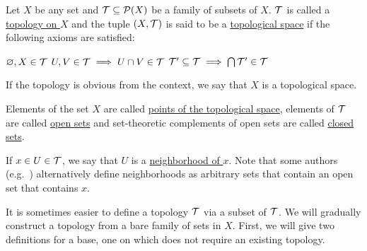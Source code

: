 \begin{definition}\label{def:topological_space}\cite[21]{Lectures:general_topology}
  Let $X$ be any set and $\mathcal T \subseteq \operatorname{\mathcal P}(X)$ be a family of subsets of $X$. $\mathcal T$ is called a \uline{topology on $X$} and the tuple $(X, \mathcal T)$ is said to be a \uline{topological space} if the following axioms are satisfied:
  \begin{description}
     $\varnothing, X \in \mathcal T$
     $U, V \in \mathcal T \implies U \cap V \in \mathcal T$
     $\mathcal T' \subseteq \mathcal T \implies \bigcap \mathcal T' \in \mathcal T$
  \end{description}

  If the topology is obvious from the context, we say that $X$ is a topological space.

  Elements of the set $X$ are called \uline{points of the topological space}, elements of $\mathcal T$ are called \uline{open sets} and set-theoretic complements of open sets are called \uline{closed sets}.

  If $x \in U \in \mathcal T$, we say that $U$ is a \uline{neighborhood of $x$}. Note that some authors (e.g.~\cite[38]{Kelley1955}) alternatively define neighborhoods as arbitrary sets that contain an open set that contains $x$.
\end{definition}

It is sometimes easier to define a topology $\mathcal T$ via a subset of $\mathcal T$. We will gradually construct a topology from a bare family of sets in $X$. First, we will give two definitions for a base, one on which does not require an existing topology.

